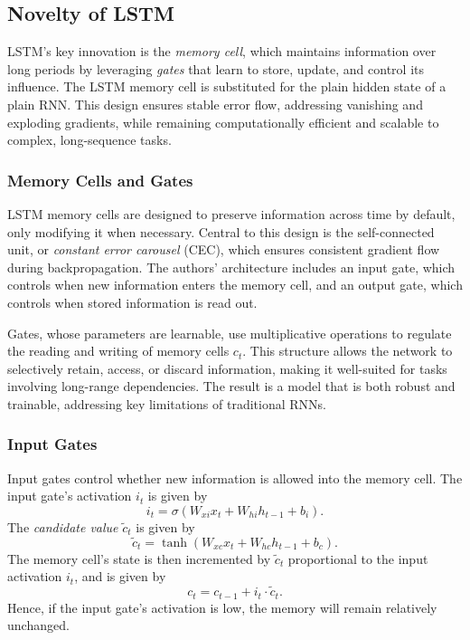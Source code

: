 \documentclass[10pt]{article}
\begin{document}
\subsection*{Novelty of LSTM}

LSTM's key innovation is the \textit{memory cell}, which maintains information over long periods by leveraging \textit{gates} that learn to store, update, and control its influence. The LSTM memory cell is substituted for the plain hidden state of a plain RNN. This design ensures stable error flow, addressing vanishing and exploding gradients, while remaining computationally efficient and scalable to complex, long-sequence tasks.

\subsubsection*{Memory Cells and Gates}

LSTM memory cells are designed to preserve information across time by default, only modifying it when necessary. Central to this design is the self-connected unit, or \textit{constant error carousel} (CEC), which ensures consistent gradient flow during backpropagation. The authors' architecture includes an input gate, which controls when new information enters the memory cell, and an output gate, which controls when stored information is read out.

Gates, whose parameters are learnable, use multiplicative operations to regulate the reading and writing of memory cells \(c_t\). This structure allows the network to selectively retain, access, or discard information, making it well-suited for tasks involving long-range dependencies. The result is a model that is both robust and trainable, addressing key limitations of traditional RNNs.

\subsubsection*{Input Gates}

Input gates control whether new information is allowed into the memory cell. The input gate's activation \(i_t\) is given by
\[
    i_t = \sigma(W_{xi} x_t + W_{hi} h_{t-1} + b_i).
\]
The \textit{candidate value} \(\tilde{c}_t\) is given by
\[
    \tilde{c}_t = \tanh(W_{xc} x_t + W_{hc} h_{t-1} + b_c).
\]
The memory cell's state is then incremented by \(\tilde{c}_t\) proportional to the input activation \(i_t\), and is given by
\[
    c_t = c_{t-1} + i_t \cdot \tilde{c}_t.
\]
Hence, if the input gate's activation is low, the memory will remain relatively unchanged.
\end{document}
